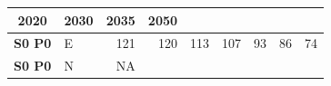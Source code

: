 \documentclass[]{article}
\begin{document}
\begin{longtable}[]{@{}clrrrrrrr@{}}
\begin{minipage}[b]{0.07\columnwidth}
2020\strut
\end{minipage} & \begin{minipage}[b]{0.07\columnwidth}\raggedleft\strut
2030\strut
\end{minipage} & \begin{minipage}[b]{0.07\columnwidth}\raggedleft\strut
2035\strut
\end{minipage} & \begin{minipage}[b]{0.07\columnwidth}\raggedleft\strut
2050\strut
\end{minipage}\tabularnewline
\midrule
\endhead
\begin{minipage}[t]{0.17\columnwidth}\centering\strut
\textbf{S0 P0}\strut
\end{minipage} & \begin{minipage}[t]{0.12\columnwidth}\raggedright\strut
E\strut
\end{minipage} & \begin{minipage}[t]{0.07\columnwidth}\raggedleft\strut
121\strut
\end{minipage} & \begin{minipage}[t]{0.07\columnwidth}\raggedleft\strut
120\strut
\end{minipage} & \begin{minipage}[t]{0.07\columnwidth}\raggedleft\strut
113\strut
\end{minipage} & \begin{minipage}[t]{0.07\columnwidth}\raggedleft\strut
107\strut
\end{minipage} & \begin{minipage}[t]{0.07\columnwidth}\raggedleft\strut
93\strut
\end{minipage} & \begin{minipage}[t]{0.07\columnwidth}\raggedleft\strut
86\strut
\end{minipage} & \begin{minipage}[t]{0.07\columnwidth}\raggedleft\strut
74\strut
\end{minipage}\tabularnewline
\begin{minipage}[t]{0.17\columnwidth}\centering\strut
\textbf{S0 P0}\strut
\end{minipage} & \begin{minipage}[t]{0.12\columnwidth}\raggedright\strut
N\strut
\end{minipage} & \begin{minipage}[t]{0.07\columnwidth}\raggedleft\strut
NA\strut
\end{minipage} & \begin{minipage}[t]{0.07\columnwidth}\raggedleft\strut

\end{minipage}
\end{longtable}
\end{document}
